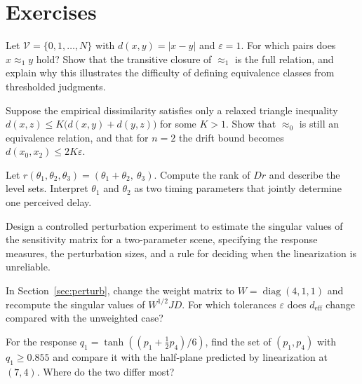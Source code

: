 \section*{Exercises}

\begin{exercise}
Let $\mathcal{V}=\{0,1,\dots,N\}$ with $d(x,y)=\lvert x-y\rvert$ and $\varepsilon=1$. For which pairs does $x\approx_1y$ hold? Show that the transitive closure of $\approx_1$ is the full relation, and explain why this illustrates the difficulty of defining equivalence classes from thresholded judgments.
\end{exercise}

\begin{exercise}
Suppose the empirical dissimilarity satisfies only a relaxed triangle inequality $d(x,z)\le K\bigl(d(x,y)+d(y,z)\bigr)$ for some $K>1$. Show that $\approx_0$ is still an equivalence relation, and that for $n=2$ the drift bound becomes $d(x_0,x_2)\le2K\varepsilon$.
\end{exercise}

\begin{exercise}
Let $r(\theta_1,\theta_2,\theta_3)=(\theta_1+\theta_2,\ \theta_3)$. Compute the rank of $Dr$ and describe the level sets. Interpret $\theta_1$ and $\theta_2$ as two timing parameters that jointly determine one perceived delay.
\end{exercise}

\begin{exercise}
Design a controlled perturbation experiment to estimate the singular values of the sensitivity matrix for a two-parameter scene, specifying the response measures, the perturbation sizes, and a rule for deciding when the linearization is unreliable.
\end{exercise}

\begin{exercise}
In Section~\ref{sec:perturb}, change the weight matrix to $W=\operatorname{diag}(4,1,1)$ and recompute the singular values of $W^{1/2}JD$. For which tolerances $\varepsilon$ does $d_{\mathrm{eff}}$ change compared with the unweighted case?
\end{exercise}

\begin{exercise}
For the response $q_1=\tanh((p_1+\tfrac12p_4)/6)$, find the set of $(p_1,p_4)$ with $q_1\ge0.855$ and compare it with the half-plane predicted by linearization at $(7,4)$. Where do the two differ most?
\end{exercise}

